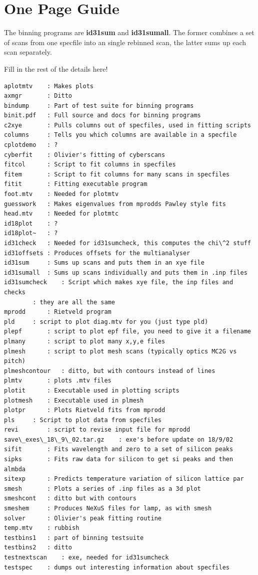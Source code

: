 \documentclass[10pt,a4paper,notitlepage]{article}
\newcommand{\code}[1]{\textbf{\textsf{#1}}} %
\begin{document}
\section{One Page Guide}
The binning programs are \code{id31sum} and \code{id31sumall}. The
former combines a set of scans from one specfile into an single
rebinned scan, the latter sums up each scan separately.

Fill in the rest of the details here!


\begin{verbatim}
aplotmtv  	: Makes plots
axmgr     	: Ditto
bindump   	: Part of test suite for binning programs
binit.pdf 	: Full source and docs for binning programs
c2xye     	: Pulls columns out of specfiles, used in fitting scripts
columns   	: Tells you which columns are available in a specfile
cplotdemo 	: ?
cyberfit  	: Olivier's fitting of cyberscans
fitcol    	: Script to fit columns in specfiles
fitem     	: Script to fit columns for many scans in specfiles
fitit     	: Fitting executable program
foot.mtv  	: Needed for plotmtv
guesswork 	: Makes eigenvalues from mprodds Pawley style fits
head.mtv  	: Needed for plotmtc
id18plot  	: ?
id18plot~	: ?
id31check 	: Needed for id31sumcheck, this computes the chi\^2 stuff
id31offsets	: Produces offsets for the multianalyser
id31sum		: Sums up scans and puts them in an xye file 
id31sumall	: Sums up scans individually and puts them in .inp files
id31sumcheck	: Script which makes xye file, the inp files and checks
		: they are all the same
mprodd		: Rietveld program
pld		: script to plot diag.mtv for you (just type pld)
plepf		: script to plot epf file, you need to give it a filename
plmany		: script to plot many x,y,e files
plmesh		: script to plot mesh scans (typically optics MC2G vs pitch)
plmeshcontour	: ditto, but with contours instead of lines
plmtv		: plots .mtv files
plotit		: Executable used in plotting scripts
plotmesh	: Executable used in plmesh
plotpr		: Plots Rietveld fits from mprodd
pls		: Script to plot data from specfiles
revi		: script to revise input file for mprodd
save\_exes\_18\_9\_02.tar.gz	: exe's before update on 18/9/02
sifit		: Fits wavelength and zero to a set of silicon peaks
sipks		: Fits raw data for silicon to get si peaks and then almbda
sitexp		: Predicts temperature variation of silicon lattice par
smesh		: Plots a series of .inp files as a 3d plot
smeshcont	: ditto but with contours
smeshem		: Produces NeXuS files for lamp, as with smesh
solver		: Olivier's peak fitting routine
temp.mtv	: rubbish
testbins1	: part of binning testsuite
testbins2	: ditto
testnextscan	: exe, needed for id31sumcheck 
testspec	: dumps out interesting information about specfiles


\end{verbatim}
\end{document}
